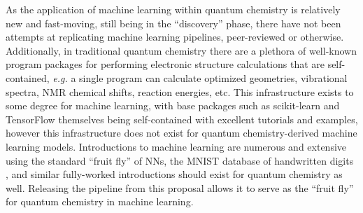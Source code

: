 \documentclass[12pt]{article}
\begin{document}
As the application of machine learning within quantum chemistry is relatively new and fast-moving, still being in the ``discovery'' phase, there have not been attempts at replicating machine learning pipelines, peer-reviewed or otherwise. Additionally, in traditional quantum chemistry there are a plethora of well-known program packages for performing electronic structure calculations \cite{QCHEM4,daltonpaper,WCMS:WCMS93} that are self-contained, \emph{e.g.} a single program can calculate optimized geometries, vibrational spectra, NMR chemical shifts, reaction energies, etc. This infrastructure exists to some degree for machine learning, with base packages such as scikit-learn \cite{scikit-learn} and TensorFlow \cite{tensorflow2015-whitepaper} themselves being self-contained with excellent tutorials and examples, however this infrastructure does not exist for quantum chemistry-derived machine learning models. Introductions to machine learning are numerous and extensive using the standard ``fruit fly'' of NNs, the MNIST database of handwritten digits \cite{lecun-01a}, and similar fully-worked introductions should exist for quantum chemistry as well. Releasing the pipeline from this proposal allows it to serve as the ``fruit fly'' for quantum chemistry in machine learning.

\printbibliography
\listoffixmes
\end{document}
